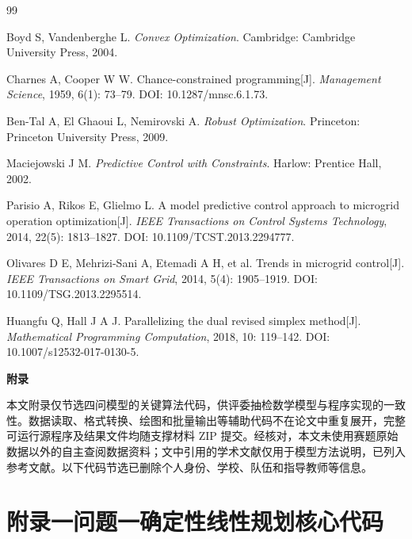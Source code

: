 \documentclass{cumcmthesis}
\begin{document}
\begin{thebibliography}{99}

Boyd S, Vandenberghe L. \textit{Convex Optimization}. Cambridge: Cambridge University Press, 2004.

Charnes A, Cooper W W. Chance-constrained programming[J]. \textit{Management Science}, 1959, 6(1): 73--79. DOI: 10.1287/mnsc.6.1.73.

Ben-Tal A, El Ghaoui L, Nemirovski A. \textit{Robust Optimization}. Princeton: Princeton University Press, 2009.

Maciejowski J M. \textit{Predictive Control with Constraints}. Harlow: Prentice Hall, 2002.

Parisio A, Rikos E, Glielmo L. A model predictive control approach to microgrid operation optimization[J]. \textit{IEEE Transactions on Control Systems Technology}, 2014, 22(5): 1813--1827. DOI: 10.1109/TCST.2013.2294777.

Olivares D E, Mehrizi-Sani A, Etemadi A H, et al. Trends in microgrid control[J]. \textit{IEEE Transactions on Smart Grid}, 2014, 5(4): 1905--1919. DOI: 10.1109/TSG.2013.2295514.

Huangfu Q, Hall J A J. Parallelizing the dual revised simplex method[J]. \textit{Mathematical Programming Computation}, 2018, 10: 119--142. DOI: 10.1007/s12532-017-0130-5.

\end{thebibliography}

\clearpage
\begin{center}
    {\bfseries 附录\par}
    \vspace{1.5em}
\end{center}

本文附录仅节选四问模型的关键算法代码，供评委抽检数学模型与程序实现的一致性。数据读取、格式转换、绘图和批量输出等辅助代码不在论文中重复展开，完整可运行源程序及结果文件均随支撑材料 ZIP 提交。经核对，本文未使用赛题原始数据以外的自主查阅数据资料；文中引用的学术文献仅用于模型方法说明，已列入参考文献。以下代码节选已删除个人身份、学校、队伍和指导教师等信息。

\section*{附录一\quad 问题一确定性线性规划核心代码}
\end{document}
